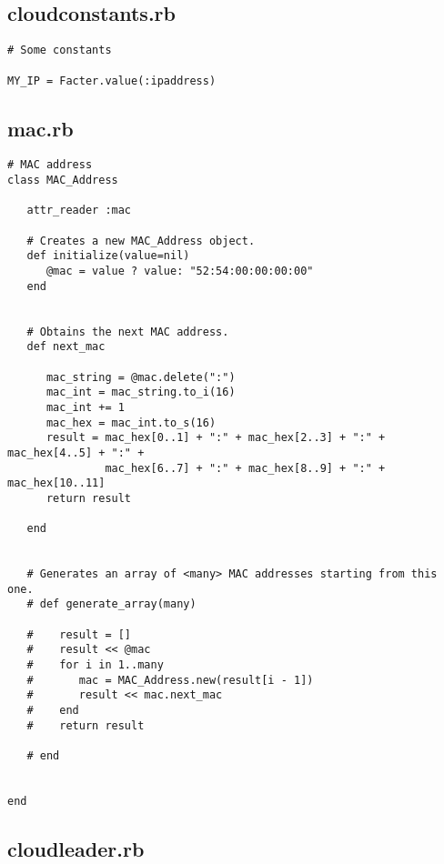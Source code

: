 \subsection{cloudconstants.rb}


\begin{lstlisting}
# Some constants

MY_IP = Facter.value(:ipaddress)
\end{lstlisting}


\subsection{mac.rb}


\begin{lstlisting}
# MAC address
class MAC_Address
   
   attr_reader :mac
   
   # Creates a new MAC_Address object.
   def initialize(value=nil)
      @mac = value ? value: "52:54:00:00:00:00"
   end
   
   
   # Obtains the next MAC address.
   def next_mac
   
      mac_string = @mac.delete(":")
      mac_int = mac_string.to_i(16)
      mac_int += 1
      mac_hex = mac_int.to_s(16)
      result = mac_hex[0..1] + ":" + mac_hex[2..3] + ":" + mac_hex[4..5] + ":" + 
               mac_hex[6..7] + ":" + mac_hex[8..9] + ":" + mac_hex[10..11]
      return result
      
   end
   
   
   # Generates an array of <many> MAC addresses starting from this one.
   # def generate_array(many)
   
   #    result = []
   #    result << @mac
   #    for i in 1..many
   #       mac = MAC_Address.new(result[i - 1])
   #       result << mac.next_mac
   #    end
   #    return result
   
   # end
   
   
end
\end{lstlisting}


\subsection{cloudleader.rb}



